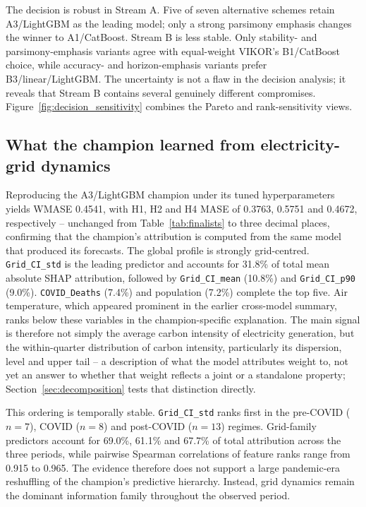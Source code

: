 \documentclass[preprint,12pt]{elsarticle}
\begin{document}
The decision is robust in Stream A. Five of seven alternative schemes retain A3/LightGBM as the leading model; only a strong parsimony emphasis changes the winner to A1/CatBoost. Stream B is less stable. Only stability- and parsimony-emphasis variants agree with equal-weight VIKOR's B1/CatBoost choice, while accuracy- and horizon-emphasis variants prefer B3/linear/LightGBM. The uncertainty is not a flaw in the decision analysis; it reveals that Stream B contains several genuinely different compromises. Figure~\ref{fig:decision_sensitivity} combines the Pareto and rank-sensitivity views.

\subsection{What the champion learned from electricity-grid dynamics}\label{sec:shap}

Reproducing the A3/LightGBM champion under its tuned hyperparameters yields WMASE 0.4541, with H1, H2 and H4 MASE of 0.3763, 0.5751 and 0.4672, respectively -- unchanged from Table~\ref{tab:finalists} to three decimal places, confirming that the champion's attribution is computed from the same model that produced its forecasts. The global profile is strongly grid-centred. \texttt{Grid\_CI\_std} is the leading predictor and accounts for 31.8\% of total mean absolute SHAP attribution, followed by \texttt{Grid\_CI\_mean} (10.8\%) and \texttt{Grid\_CI\_p90} (9.0\%). \texttt{COVID\_Deaths} (7.4\%) and population (7.2\%) complete the top five. Air temperature, which appeared prominent in the earlier cross-model summary, ranks below these variables in the champion-specific explanation. The main signal is therefore not simply the average carbon intensity of electricity generation, but the within-quarter distribution of carbon intensity, particularly its dispersion, level and upper tail -- a description of what the model attributes weight to, not yet an answer to whether that weight reflects a joint or a standalone property; Section~\ref{sec:decomposition} tests that distinction directly.

This ordering is temporally stable. \texttt{Grid\_CI\_std} ranks first in the pre-COVID ($n=7$), COVID ($n=8$) and post-COVID ($n=13$) regimes. Grid-family predictors account for 69.0\%, 61.1\% and 67.7\% of total attribution across the three periods, while pairwise Spearman correlations of feature ranks range from 0.915 to 0.965. The evidence therefore does not support a large pandemic-era reshuffling of the champion's predictive hierarchy. Instead, grid dynamics remain the dominant information family throughout the observed period.
\end{document}
